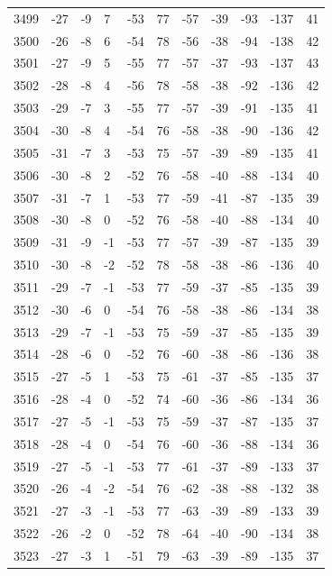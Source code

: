\begin{table}[H]
\begin{tabular}{lllllllllll}
3499 & -27 & -9 & 7 & -53 & 77 & -57 & -39 & -93 & -137 & 41 \\
3500 & -26 & -8 & 6 & -54 & 78 & -56 & -38 & -94 & -138 & 42 \\
3501 & -27 & -9 & 5 & -55 & 77 & -57 & -37 & -93 & -137 & 43 \\
3502 & -28 & -8 & 4 & -56 & 78 & -58 & -38 & -92 & -136 & 42 \\
3503 & -29 & -7 & 3 & -55 & 77 & -57 & -39 & -91 & -135 & 41 \\
3504 & -30 & -8 & 4 & -54 & 76 & -58 & -38 & -90 & -136 & 42 \\
3505 & -31 & -7 & 3 & -53 & 75 & -57 & -39 & -89 & -135 & 41 \\
3506 & -30 & -8 & 2 & -52 & 76 & -58 & -40 & -88 & -134 & 40 \\
3507 & -31 & -7 & 1 & -53 & 77 & -59 & -41 & -87 & -135 & 39 \\
3508 & -30 & -8 & 0 & -52 & 76 & -58 & -40 & -88 & -134 & 40 \\
3509 & -31 & -9 & -1 & -53 & 77 & -57 & -39 & -87 & -135 & 39 \\
3510 & -30 & -8 & -2 & -52 & 78 & -58 & -38 & -86 & -136 & 40 \\
3511 & -29 & -7 & -1 & -53 & 77 & -59 & -37 & -85 & -135 & 39 \\
3512 & -30 & -6 & 0 & -54 & 76 & -58 & -38 & -86 & -134 & 38 \\
3513 & -29 & -7 & -1 & -53 & 75 & -59 & -37 & -85 & -135 & 39 \\
3514 & -28 & -6 & 0 & -52 & 76 & -60 & -38 & -86 & -136 & 38 \\
3515 & -27 & -5 & 1 & -53 & 75 & -61 & -37 & -85 & -135 & 37 \\
3516 & -28 & -4 & 0 & -52 & 74 & -60 & -36 & -86 & -134 & 36 \\
3517 & -27 & -5 & -1 & -53 & 75 & -59 & -37 & -87 & -135 & 37 \\
3518 & -28 & -4 & 0 & -54 & 76 & -60 & -36 & -88 & -134 & 36 \\
3519 & -27 & -5 & -1 & -53 & 77 & -61 & -37 & -89 & -133 & 37 \\
3520 & -26 & -4 & -2 & -54 & 76 & -62 & -38 & -88 & -132 & 38 \\
3521 & -27 & -3 & -1 & -53 & 77 & -63 & -39 & -89 & -133 & 39 \\
3522 & -26 & -2 & 0 & -52 & 78 & -64 & -40 & -90 & -134 & 38 \\
3523 & -27 & -3 & 1 & -51 & 79 & -63 & -39 & -89 & -135 & 37 \\

\end{tabular}
\end{table}
